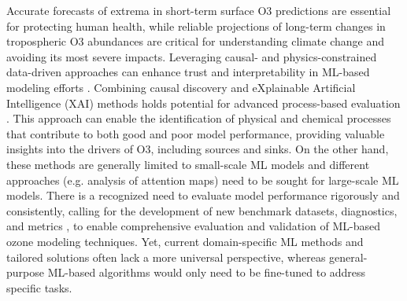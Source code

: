 \documentclass[gmd, manuscript]{copernicus}
\begin{document}
Accurate forecasts of extrema in short-term surface O3 predictions are essential for protecting human health, while reliable projections of long-term changes in tropospheric O3 abundances are critical for understanding climate change and avoiding its most severe impacts. Leveraging causal- and physics-constrained data-driven approaches can enhance trust and interpretability in ML-based modeling efforts \citep{Tesch2023,Beucler2024}. Combining causal discovery and eXplainable Artificial Intelligence (XAI) methods holds potential for advanced process-based evaluation \citep{IglesiasSuarez2024}. This approach can enable the identification of physical and chemical processes that contribute to both good and poor model performance, providing valuable insights into the drivers of O3, including sources and sinks. On the other hand, these methods are generally limited to small-scale ML models and different approaches (e.g. analysis of attention maps) need to be sought for large-scale ML models. There is a recognized need to evaluate model performance rigorously and consistently, calling for the development of new benchmark datasets, diagnostics, and metrics \citep{Betancourt2021, betancourt_global_2022}, to enable comprehensive evaluation and validation of ML-based ozone modeling techniques. Yet, current domain-specific ML methods and tailored solutions often lack a more universal perspective, whereas general-purpose ML-based algorithms would only need to be fine-tuned to address specific tasks. 
\end{document}
